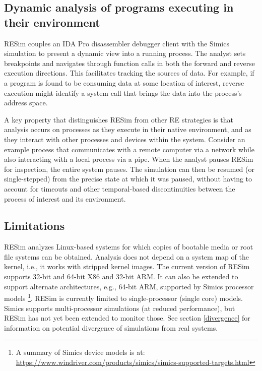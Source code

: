 \documentclass[titlepage]{article}
\begin{document}
\subsection{Dynamic analysis of programs executing in their environment}
RESim couples an IDA Pro disassembler debugger client with the Simics simulation to present a dynamic view into a running process.  The analyst sets breakpoints and navigates through function calls in both the forward and reverse execution directions.  This facilitates tracking the sources of data.  For example, if a program is found to be consuming data at some location of interest, reverse execution might identify a system call that brings the data into the process’s address space.

A key property that distinguishes RESim from other RE strategies is that analysis occurs on processes as they execute in their native environment, and as they interact with other processes and devices within the system.  Consider an example process that communicates with a remote computer via a network while also interacting with a local process via a pipe.  When the analyst pauses RESim for inspection, the entire system pauses.  The simulation can then be resumed (or single-stepped) from the precise state at which it was paused, without having to account for timeouts and other temporal-based discontinuities between the process of interest and its environment.

\subsection{Limitations}
RESim analyzes Linux-based systems for which copies of bootable media or root file systems can be obtained.  Analysis does not depend on a system map of the kernel, i.e., it works with stripped kernel images.  The current version of RESim supports 32-bit and 64-bit X86 and 32-bit ARM.  It can also be 
extended to support alternate architectures, e.g., 64-bit ARM, supported by Simics processor models \footnote{A summary of Simics device models is at: \url{https://www.windriver.com/products/simics/simics-supported-targets.html}}.  RESim is currently limited to single-processor (single core) models.  Simics supports
multi-processor simulations (at reduced performance), but RESim has not yet been extended to monitor those.
See section \ref{divergence} for information on potential divergence of simulations from real systems.
\end{document}
